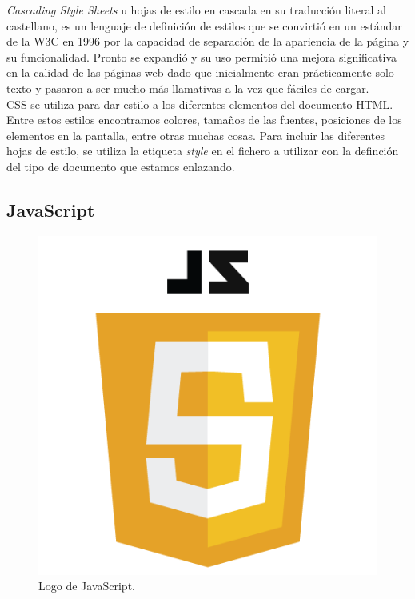 \textit{Cascading Style Sheets} u hojas de estilo en cascada en su traducci\'on literal al castellano, es un lenguaje de definici\'on de estilos que se convirti\'o en un est\'andar de la W3C en 1996 por la capacidad de separaci\'on de la apariencia de la p\'agina y su funcionalidad. Pronto se expandi\'o y su uso permiti\'o una mejora significativa en la calidad de las p\'aginas web dado que inicialmente eran pr\'acticamente solo texto y pasaron a ser mucho m\'as llamativas a la vez que f\'aciles de cargar.\\

CSS se utiliza para dar estilo a los diferentes elementos del documento HTML. Entre estos estilos encontramos colores, tama\~nos de las fuentes, posiciones de los elementos en la pantalla, entre otras muchas cosas. Para incluir las diferentes hojas de estilo, se utiliza la etiqueta \textit{style} en el fichero a utilizar con la definci\'on del tipo de documento que estamos enlazando.\\

\subsection{JavaScript}

\begin{figure}[htbp]

    \centering
    	\includegraphics[scale=0.3]{./Figuras/javaScriptlogo.png}
    \caption{Logo de JavaScript. }
    \label{fig:javascript}
    
\end{figure}


